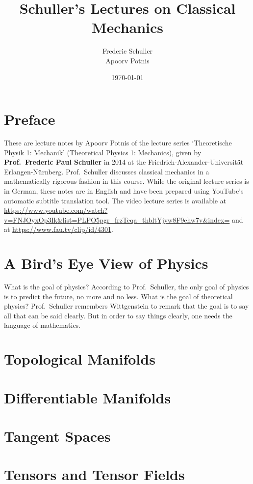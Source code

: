 \documentclass[a4 paper, oneside, 12pt]{book}
\title{Schuller's Lectures on Classical Mechanics}
\author{Frederic Schuller\\Apoorv Potnis}
\date{\today}
\theoremstyle{definition}
\begin{document}
	\hypertarget{TitlePage}{}
	\maketitle

	\chapter*{Preface}
	\hypertarget{Preface}{}
	These are lecture notes by Apoorv Potnis of the lecture series `Theoretische Physik 1: Mechanik' (Theoretical Physics 1: Mechanics), given by \textbf{Prof.\ Frederic Paul Schuller} in 2014 at the Friedrich-Alexander-Universität Erlangen-Nürnberg. Prof.\ Schuller discusses classical mechanics in a mathematically rigorous fashion in this course. While the original lecture series is in German, these notes are in English and have been prepared using YouTube's automatic subtitle translation tool. The video lecture series is available at \url{https://www.youtube.com/watch?v=FNJOyxOp3Ik&list=PLPO5pgr_frzTeqa_thbltYjyw8F9ehw7v&index=} and at \url{https://www.fau.tv/clip/id/4301}.
	\clearpage

	\hypertarget{Contents}{}
	\tableofcontents

	\chapter{A Bird's Eye View of Physics}

	What is the goal of physics? According to Prof.\ Schuller, the only goal of physics is to predict the future, no more and no less. What is the goal of theoretical physics? Prof.\ Schuller remembers Wittgenstein to remark that the goal is to say all that can be said clearly. But in order to say things clearly, one needs the language of mathematics.

	\chapter{Topological Manifolds}

	\chapter{Differentiable Manifolds}

	\chapter{Tangent Spaces}

	\chapter{Tensors and Tensor Fields}

	\nocite{*}
	\printbibliography[heading=bibintoc]
	\printindex
\end{document}
